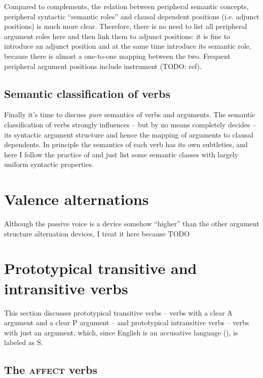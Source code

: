 \documentclass[UTF8, a4paper, oneside, scheme=plain]{ctexrep}
\newcommand*{\citepage}[1]{pp.~{#1}}
\newcommand{\category}[1]{\textsc{#1}}
\begin{document}
Compared to complements, the relation between peripheral semantic concepts,
peripheral syntactic ``semantic roles'' 
and clausal dependent positions (i.e. adjunct positions)
is much more clear. 
Therefore, there is no need to list all peripheral argument roles here 
and then link them to adjunct positions: 
it is fine to introduce an adjunct position and at the same time introduce its semantic role,
because there is almost a one-to-one mapping between the two.
Frequent peripheral argument positions include %
instrument (TODO: ref).

\subsection{Semantic classification of verbs}

Finally it's time to discuss \emph{pure} semantics of verbs and arguments.
The semantic classification of verbs strongly influences -- but by no means completely decides --
its syntactic argument structure 
and hence the mapping of arguments to clausal dependents.
In principle the semantics of each verb has its own subtleties,
and here I follow the practice of \citet{dixon2005semantic}
and just list some semantic classes with largely uniform syntactic properties.

\section{Valence alternations}

Although the passive voice is a device somehow ``higher'' than the other argument structure alternation devices,
I treat it here because TODO 

\citep[\citepage{249, 1433}]{cgel}

\section{Prototypical transitive and intransitive verbs}

This section discusses prototypical transitive verbs -- verbs with a clear A argument and a clear P argument --
and prototypical intransitive verbs -- verbs with just an argument,
which, since English is an accusative language (),
is labeled as S.

\subsection{The \category{affect} verbs}
\end{document}
